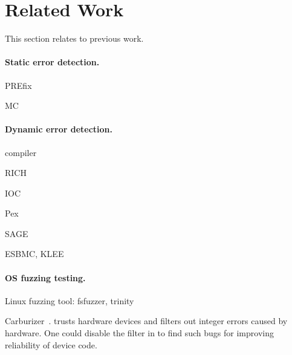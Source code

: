 \section{Related Work}
\label{s:relwk}

This section relates \sys to previous work.

\paragraph{Static error detection.}

PREfix~\cite{moy:prefix}

MC

\paragraph{Dynamic error detection.}

compiler

RICH~\cite{brumley:rich}

IOC

Pex

SAGE

ESBMC, KLEE

\paragraph{OS fuzzing testing.}

Linux fuzzing tool: fsfuzzer, trinity

Carburizer~\cite{kadav:tolerating}.
\sys trusts hardware devices and filters out integer errors
caused by hardware.  One could disable the filter in \sys
to find such bugs for improving reliability of device code.
